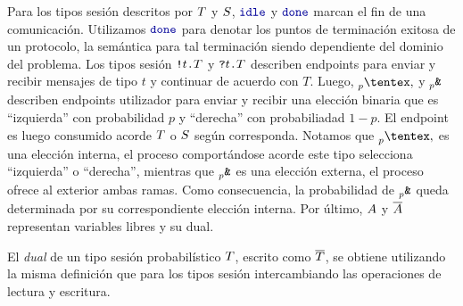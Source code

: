 Para los tipos sesión descritos por $T$ y $S$, $\Idle$
y $\Done$ marcan el fin de una comunicación. Utilizamos $\Done$ para denotar
los puntos de terminación exitosa de un protocolo, la semántica para tal
terminación siendo dependiente del dominio del problema. Los tipos sesión
${\texttt{\upshape!}}{t}\texttt{\upshape.}T$ y ${\texttt{\upshape?}}{t}\texttt{\upshape.}T$ describen endpoints para
enviar y recibir mensajes de tipo $t$ y continuar de acuerdo con $T$. Luego,
$\PChoice$ y
$\PBranch$ describen endpoints utilizador para
enviar y recibir una elección binaria que es ``izquierda'' con probabilidad $p$
y ``derecha'' con probabiliadad $1 - p$. El endpoint es luego consumido acorde
$T$ o $S$ según corresponda. Notamos que $\PChoice{}{}$
es una elección interna, el proceso comportándose acorde este tipo selecciona
``izquierda'' o ``derecha'', mientras que $\PBranch$ es una elección
externa, el proceso ofrece al exterior ambas ramas. Como consecuencia, la
probabilidad de $\PBranch$ queda determinada por su correspondiente
elección interna. Por último, $A$ y $\overline{A}$ representan variables
libres y su dual.

El \emph{dual} de un tipo sesión probabilístico $T$, escrito como
$\overline{T}$, se obtiene utilizando la misma definición que para los
tipos sesión intercambiando las operaciones de lectura y escritura.
